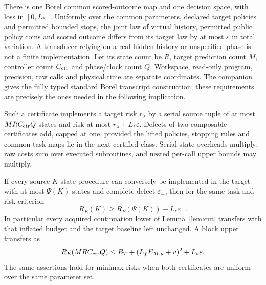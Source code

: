 There is one Borel common scored-outcome map and one decision space, with loss in $[0,L_*]$. Uniformly over the common parameters, declared target policies and permitted bounded stops, the joint law of virtual history, permitted public policy coins and scored outcome differs from its target law by at most $\varepsilon$ in total variation. A transducer relying on a real hidden history or unspecified phase is not a finite implementation. Let its state count be $R$, target prediction count $M$, controller count $C_{\rm ctr}$ and phase/clock count $Q$. Workspace, read-only program, precision, raw calls and physical time are separate coordinates. The companion~\cite{companion} gives the fully typed standard Borel transcript construction; these requirements are precisely the ones needed in the following implication.

\begin{theorem}\label{thm:morphism}
Such a certificate implements a target risk $r_\lambda$ by a serial source tuple of at most $MR C_{\rm ctr}Q$ states and risk at most $r_\lambda+L_*\varepsilon$. Defects of two composable certificates add, capped at one, provided the lifted policies, stopping rules and common-task maps lie in the next certified class. Serial state overheads multiply; raw costs sum over executed subroutines, and nested per-call upper bounds may multiply.

If every source $K$-state procedure can conversely be implemented in the target with at most $\Psi(K)$ states and complete defect $\varepsilon_-$, then for the same task and risk criterion
\begin{equation}\label{eq:morphismlower}
 R_E(K)\ge R_F(\Psi(K))-L_*\varepsilon_-.
\end{equation}
In particular every acquired continuation lower of Lemma~\ref{lem:cut} transfers with that inflated budget and the target baseline left unchanged. A block upper transfers as
\begin{equation}\label{eq:morphismupper}
 R_E(MRC_{\rm ctr}Q)
 \le B_T+(L_fE_{M,u}+v)^2+L_*\varepsilon.
\end{equation}
The same assertions hold for minimax risks when both certificates are uniform over the same parameter set.
\end{theorem}
